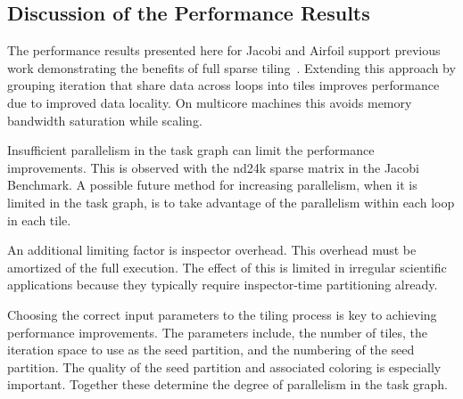 \subsection{Discussion of the Performance Results}

The performance results presented here for Jacobi and Airfoil support 
previous work demonstrating the benefits of full sparse 
tiling~\citep{ST-StroutIJHPCA,ST-StroutPLDI03,ST-commAvoidingSparse2009}.
Extending this approach by grouping iteration that share data across 
loops into tiles improves performance due to improved data locality. 
On multicore machines this avoids memory bandwidth saturation while scaling.

Insufficient parallelism in the task graph can limit the performance improvements. 
This is observed with the nd24k sparse matrix in the Jacobi Benchmark.
A possible future method for increasing parallelism, when it is limited in the task 
graph, is to take advantage of the parallelism within each loop in each tile.

An additional limiting factor is inspector overhead. This overhead 
must be amortized of the full execution. The effect of this is limited 
in irregular scientific applications because they typically require inspector-time partitioning already.

Choosing the correct input parameters to the tiling process is key to 
achieving performance improvements. The parameters include, the 
number of tiles, the iteration space to use as the seed partition, and 
the numbering of the seed partition. The quality of the seed partition 
and associated coloring is especially important. Together these determine 
the degree of parallelism in the task graph. 



